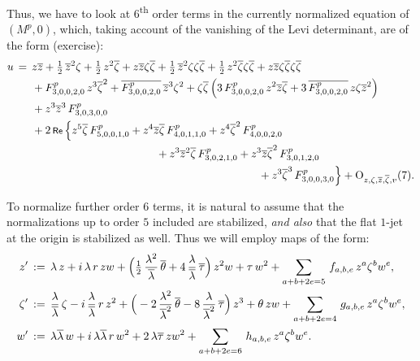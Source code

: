 \documentclass[12pt,twoside,leqno,openany]{amsart}
\begin{document}
Thus, we have to look at 6\textsuperscript{th} order terms
in the currently normalized equation of $(M^p, 0)$,
which, taking account of the vanishing of the Levi determinant,
are of the form (exercise):
\[
\aligned
u
&
\,=\,
z\overline{z}
+
\tfrac{1}{2}\,
\overline{z}^2\zeta
+
\tfrac{1}{2}\,
z^2\overline{\zeta}
+
z\overline{z}\zeta\overline{\zeta}
+
\tfrac{1}{2}\,\overline{z}^2\zeta\zeta\overline{\zeta}
+
\tfrac{1}{2}\,z^2\overline{\zeta}\zeta\overline{\zeta}
+
z\overline{z}\zeta\overline{\zeta}\zeta\overline{\zeta}
\\
&
\ \ \ \ \
+
F_{3,0,0,2,0}^p\,z^3\overline{\zeta}^2
+
\overline{F_{3,0,0,2,0}^p}\,
\overline{z}^3\zeta^2
+
\zeta\overline{\zeta}\,
\Big(
3\,F_{3,0,0,2,0}^p\,
z^2\overline{z}\overline{\zeta}
+
3\,\overline{F_{3,0,0,2,0}^p}\,z\zeta\overline{z}^2
\Big)
\\
&
\ \ \ \ \
+
z^3\overline{z}^3\,
F_{3,0,3,0,0}^p
\\
&
\ \ \ \ \
+
2\,\Re\,\Big\{
z^5\overline{\zeta}\,
F_{5,0,0,1,0}^p
+
z^4\overline{z}\overline{\zeta}\,
F_{4,0,1,1,0}^p
+
z^4\overline{\zeta}^2\,
F_{4,0,0,2,0}^p
\\
&
\ \ \ \ \ \ \ \ \ \ \ \ \ \ \ \ \ \ \ \ \ \ \ \ \ \ \ \ \ \ \ \ \ \ \
\ \ \ \ 
+
z^3\overline{z}^2\overline{\zeta}\,
F_{3,0,2,1,0}^p
+
z^3\overline{z}\overline{\zeta}^2\,
F_{3,0,1,2,0}^p
\\
&
\ \ \ \ \ \ \ \ \ \ \ \ \ \ \ \ \ \ \ \ \ \ \ \ \ \ \ \ \ \ \ \ \ \ \
\ \ \ \ \ \ \ \ \ \ \ \ \ \ \ \ \ \ \ \ \ \ \ \ \ \ \ 
\ \ \ \ \
+
z^3\overline{\zeta}^3\,
F_{3,0,0,3,0}^p
\Big\}
+
{\rm O}_{z,\zeta,\overline{z},\overline{\zeta},v}(7).
\endaligned
\]

To normalize further order $6$ terms, it is natural 
to assume that the normalizations up to order $5$ included
are stabilized, {\em and also} that the flat $1$-jet
at the origin is stabilized
as well. Thus we will employ maps of the form:
\[
\aligned
z'
&
\,:=\,
\lambda\,z
+
i\,\lambda\,r\,
zw
+
\Big(
\tfrac{1}{2}\,
\frac{\lambda^2}{\overline{\lambda}}\,
\overline{\theta}
+
4\,\frac{\lambda}{\overline{\lambda}}\,
\overline{\tau}
\Big)\,
z^2w
+
\tau\,
w^2
+
\sum_{a+b+2e=5}\,
f_{a,b,e}\,
z^a\zeta^bw^e,
\\
\zeta'
&
\,:=\,
\frac{\lambda}{\overline{\lambda}}\,
\zeta
-
i\,
\frac{\lambda}{\overline{\lambda}}\,r\,
z^2
+
\Big(
-2\,\frac{\lambda^2}{\overline{\lambda}^2}\,
\overline{\theta}
-
8\,\frac{\lambda}{\overline{\lambda}^2}\,\overline{\tau}
\Big)\,
z^3
+
\theta\,
zw
+
\sum_{a+b+2e=4}\,
g_{a,b,e}\,
z^a\zeta^bw^e,
\\
w'
&
\,:=\,
\lambda\overline{\lambda}\,w
+
i\,\lambda\overline{\lambda}\,r\,
w^2
+
2\,\lambda\overline{\tau}\,
zw^2
+
\sum_{a+b+2e=6}\,
h_{a,b,e}\,
z^a\zeta^bw^e.
\endaligned
\]
\end{document}
